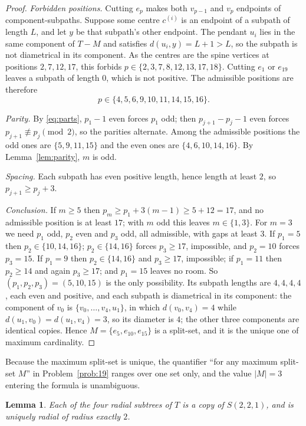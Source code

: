 \documentclass[11pt]{amsart}
\newtheorem{lemma}[theorem]{Lemma}
\theoremstyle{definition}
\begin{document}
\begin{proof}
\emph{Forbidden positions.} Cutting $e_p$ makes both $v_{p-1}$ and $v_p$
endpoints of component-subpaths. Suppose some centre $c^{(i)}$ is an endpoint of
a subpath of length $L$, and let $y$ be that subpath's other endpoint. The
pendant $u_i$ lies in the same component of $T-M$ and satisfies
$d(u_i,y)=L+1>L$, so the subpath is not diametrical in its component. As the
centres are the spine vertices at positions $2,7,12,17$, this forbids
$p\in\{2,3,7,8,12,13,17,18\}$. Cutting $e_1$ or $e_{19}$ leaves a subpath of
length $0$, which is not positive. The admissible positions are therefore
\[
  p\in\{4,5,6,9,10,11,14,15,16\}.
\]

\emph{Parity.} By \eqref{eq:parts}, $p_1-1$ even forces $p_1$ odd; then
$p_{j+1}-p_j-1$ even forces $p_{j+1}\not\equiv p_j\pmod 2$, so the parities
alternate. Among the admissible positions the odd ones are $\{5,9,11,15\}$ and
the even ones are $\{4,6,10,14,16\}$. By Lemma~\ref{lem:parity}, $m$ is odd.

\emph{Spacing.} Each subpath has even positive length, hence length at least
$2$, so $p_{j+1}\ge p_j+3$.

\emph{Conclusion.} If $m\ge 5$ then $p_m\ge p_1+3(m-1)\ge 5+12=17$, and no
admissible position is at least $17$; with $m$ odd this leaves $m\in\{1,3\}$.
For $m=3$ we need $p_1$ odd, $p_2$ even and $p_3$ odd, all admissible, with gaps
at least $3$. If $p_1=5$ then $p_2\in\{10,14,16\}$; $p_2\in\{14,16\}$ forces
$p_3\ge 17$, impossible, and $p_2=10$ forces $p_3=15$. If $p_1=9$ then
$p_2\in\{14,16\}$ and $p_3\ge 17$, impossible; if $p_1=11$ then $p_2\ge 14$ and
again $p_3\ge 17$; and $p_1=15$ leaves no room. So $(p_1,p_2,p_3)=(5,10,15)$ is
the only possibility. Its subpath lengths are $4,4,4,4$, each even and positive,
and each subpath is diametrical in its component: the component of $v_0$ is
$\{v_0,\dots,v_4,u_1\}$, in which $d(v_0,v_4)=4$ while $d(u_1,v_0)=d(u_1,v_4)=3$,
so its diameter is $4$; the other three components are identical copies. Hence
$M=\{e_5,e_{10},e_{15}\}$ is a split-set, and it is the unique one of maximum
cardinality.
\end{proof}

Because the maximum split-set is unique, the quantifier ``for any maximum
split-set $M$'' in Problem~\ref{prob:19} ranges over one set only, and the value
$|M|=3$ entering the formula is unambiguous.

\begin{lemma}\label{lem:ur}
Each of the four radial subtrees of $T$ is a copy of $S(2,2,1)$, and is uniquely
radial of radius exactly $2$.
\end{lemma}
\end{document}
